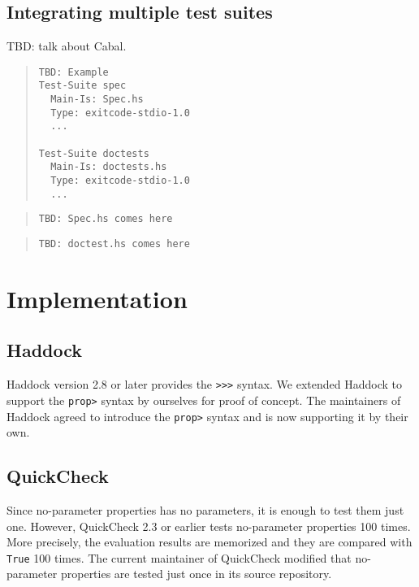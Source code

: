 \documentclass[preprint]{sigplanconf}
\begin{document}
\subsection{Integrating multiple test suites}

TBD: talk about Cabal.

\begin{quote}
\begin{verbatim}
TBD: Example
Test-Suite spec
  Main-Is: Spec.hs
  Type: exitcode-stdio-1.0
  ...

Test-Suite doctests
  Main-Is: doctests.hs
  Type: exitcode-stdio-1.0
  ...
\end{verbatim}
\end{quote}

\begin{quote}
\begin{verbatim}
TBD: Spec.hs comes here
\end{verbatim}
\end{quote}

\begin{quote}
\begin{verbatim}
TBD: doctest.hs comes here
\end{verbatim}
\end{quote}


\section{Implementation}

\subsection{Haddock}

Haddock version 2.8 or later provides the {\tt >>>} syntax. 
We extended Haddock to support the {\tt prop>} syntax by ourselves
for proof of concept.
The maintainers of Haddock agreed to introduce 
the {\tt prop>} syntax and is now supporting it by their own.

\subsection{QuickCheck}

Since no-parameter properties has no parameters, 
it is enough to test them just one.
However, QuickCheck 2.3 or earlier tests no-parameter properties 100 times.
More precisely, the evaluation results are memorized and they are
compared with {\tt True} 100 times.
The current maintainer of QuickCheck modified that
no-parameter properties are tested just once in its source repository.
\end{document}
